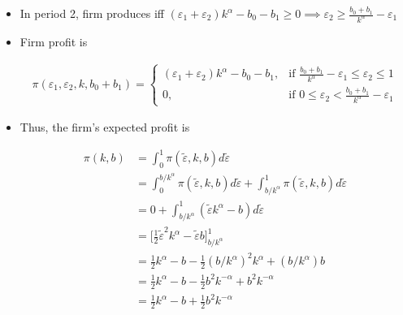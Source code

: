 \documentclass{article}
\begin{document}
\begin{itemize}
\item In period 2, firm produces iff $(\varepsilon_1 + \varepsilon_2) k ^ \alpha - b_0 - b_1 \ge 0 \implies \varepsilon_2 \ge \frac{b_0 + b_1}{k^\alpha} - \varepsilon_1$

\item Firm profit is

\begin{align*}
\pi(\varepsilon_1, \varepsilon_2, k, b_0+b_1) = \begin{cases} (\varepsilon_1 + \varepsilon_2) k^\alpha - b_0 - b_1, & \text{if }  \frac{b_0 + b_1}{k^\alpha} - \varepsilon_1 \le \varepsilon_2 \le 1 \\ 0, & \text{if } 0 \le \varepsilon_2 < \frac{b_0 + b_1}{k^\alpha} - \varepsilon_1 \end{cases}
\end{align*}

\item Thus, the firm's expected profit is

\begin{align*}
\pi(k,b) 
&= \int_0^1 \pi(\tilde \varepsilon, k, b) d \tilde \varepsilon\\
&= \int_{0}^{b/k^\alpha}  \pi(\tilde \varepsilon, k, b) d \tilde \varepsilon  + \int_{b/k^\alpha}^1 \pi(\tilde \varepsilon, k, b) d \tilde \varepsilon \\  &= 0+\int_{b/k^\alpha}^1 (\tilde \varepsilon k^\alpha - b) d \tilde \varepsilon \\
&= \Bigg[\frac{1}{2}\tilde \varepsilon^2 k^\alpha -\tilde \varepsilon b \Bigg]_{b/k^\alpha}^1\\
&= \frac{1}{2} k^\alpha - b - \frac{1}{2}(b/k^\alpha)^2 k^\alpha + (b/k^\alpha) b\\
&= \frac{1}{2} k^\alpha - b - \frac{1}{2}b^2 k^{-\alpha} + b^2 k^{-\alpha}\\
&= \frac{1}{2} k^\alpha - b + \frac{1}{2}b^2 k^{-\alpha}
\end{align*}

\end{itemize}
\end{document}
